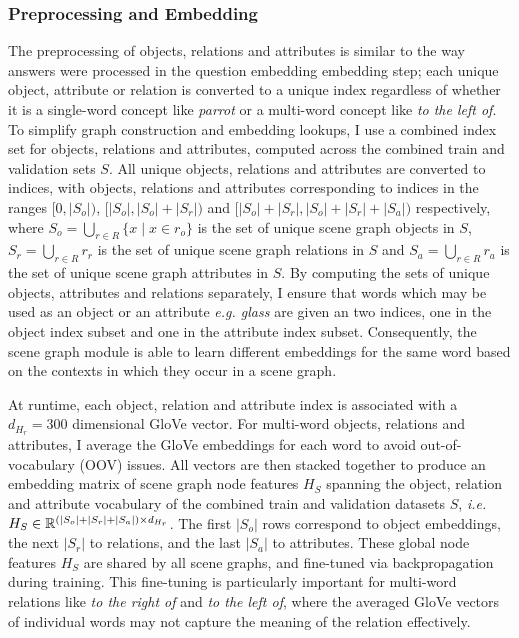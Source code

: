 \subsubsection{Preprocessing and Embedding}
The preprocessing of objects, relations and attributes is similar to the way answers were processed in the question embedding embedding step; each unique object, attribute or relation is converted to a unique index regardless of whether it is a single-word concept like \textit{parrot} or a multi-word concept like \textit{to the left of}. To simplify graph construction and embedding lookups, I use a combined index set for objects, relations and attributes, computed across the combined train and validation sets \(S\). All unique objects, relations and attributes are converted to indices, with objects, relations and attributes corresponding to indices in the ranges \([0, |S_o|)\), \([|S_o|, |S_o| + |S_r|)\) and  \([|S_o| + |S_r|, |S_o| + |S_r| + |S_a|)\) respectively, where \(S_o = \bigcup_{r \in R} \{x \mid x \in r_o\}\) is the set of unique scene graph objects in \(S\), \(S_r = \bigcup_{r \in R} r_r\) is the set of unique scene graph relations in \(S\) and \(S_a = \bigcup_{r \in R} r_a\) is the set of unique scene graph  attributes in \(S\). By computing the sets of unique objects, attributes and relations separately, I ensure that words which may be used as an object or an attribute \textit{e.g. glass} are given an two indices, one in the object index subset and one in the attribute index subset. Consequently, the scene graph module is able to learn different embeddings for the same word based on the contexts in which they occur in a scene graph.

At runtime, each object, relation and attribute index is associated with a \(d_{H_r} = 300\) dimensional GloVe vector. For multi-word objects, relations and attributes, I average the GloVe embeddings for each word to avoid out-of-vocabulary (OOV) issues. All vectors are then stacked together to produce an embedding matrix of scene graph node features \(H_S\) spanning the object, relation and attribute vocabulary of the combined train and validation datasets \(S\), \textit{i.e.} \(H_S \in \mathbb{R}^{(|S_o| + |S_r| + |S_a|) \times d_{H_r}}\). The first \(|S_o|\) rows correspond to object embeddings, the next \(|S_r|\) to relations, and the last \(|S_a|\) to attributes. These global node features \(H_S\) are shared by all scene graphs, and fine-tuned via backpropagation  during training. This fine-tuning is particularly important for multi-word relations like \textit{to the right of} and \textit{to the left of}, where the averaged GloVe vectors of individual words may not capture the meaning of the relation effectively.

